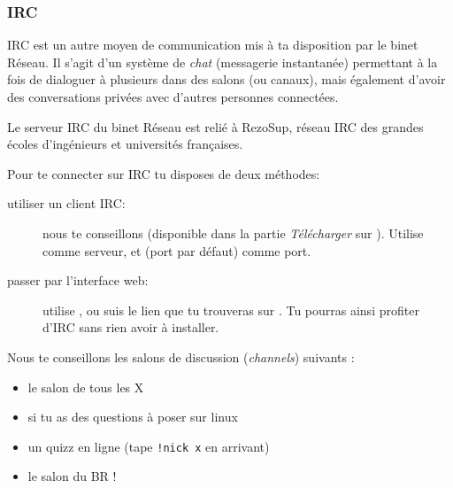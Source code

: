 
\subsubsection{IRC}

\label{irc}

IRC est un autre moyen de communication mis à ta disposition par le binet Réseau. Il s'agit d'un système de \emph{chat} (messagerie instantanée) permettant à la fois de dialoguer à plusieurs dans des salons (ou canaux), mais également d'avoir des conversations privées avec d'autres personnes connectées.


Le serveur IRC du binet Réseau est relié à RezoSup, réseau IRC des grandes écoles d'ingénieurs et universités françaises.

Pour te connecter sur IRC tu disposes de deux méthodes:



\begin{description}
\item[utiliser un client IRC:] nous te conseillons  (disponible dans la partie \emph{Télécharger} sur \fkz). Utilise   comme serveur, et  (port par défaut) comme port.
  \item[passer par l'interface web:] utilise , ou suis le lien  que tu trouveras sur \fkz. Tu pourras ainsi profiter d'IRC sans rien avoir à  installer.
\end{description}

 
Nous te conseillons les salons de discussion (\emph{channels}) suivants :
\begin{itemize}
  \item {} le salon de tous les X
  \item {} si tu as des questions \`a poser sur linux
  \item {} un quizz en ligne (tape \texttt{!nick x} en arrivant)
  \item {} le salon du BR !
\end{itemize}
